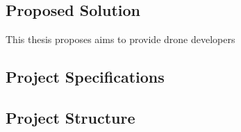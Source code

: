 
\subsection{Proposed Solution}
    This thesis proposes aims to provide drone developers 


\subsection{Project Specifications}

\subsection{Project Structure}
